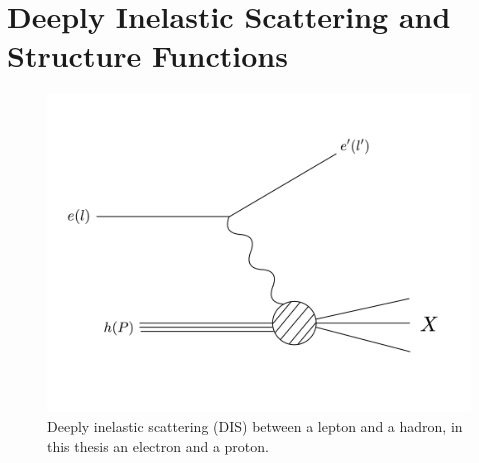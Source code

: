 
%

\section{Deeply Inelastic Scattering and Structure Functions}

\begin{figure}
	\centering
	\includegraphics[width = \textwidth]{image/diagrams/dis-feynman.png}	
	\caption[A diagrammatic representation of deeply inelastic scattering.]{Deeply inelastic scattering (DIS) between a lepton and a hadron, in this thesis an electron and a proton.}
	\label{fig:dis}
\end{figure}

